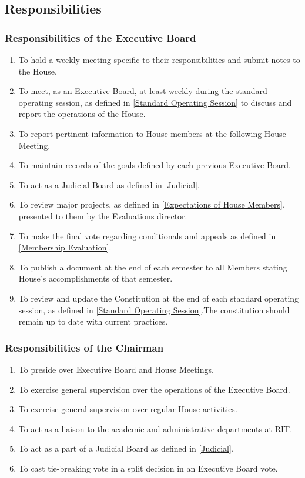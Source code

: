 \documentclass{article}
\newcommand{\asection}[1]{\subsection{#1} \label{#1}}
\newcommand{\asubsection}[1]{\subsubsection{#1} \label{#1}}
\begin{document}
\asection{Responsibilities}
\renewcommand{\theenumi}{\alph{enumi}} %
\asubsection{Responsibilities of the Executive Board}
\begin{enumerate}
	\item To hold a weekly meeting specific to their responsibilities and submit notes to the House.
	\item To meet, as an Executive Board, at least weekly during the standard operating session, as defined in \ref{Standard Operating Session} to discuss and report the operations of the House.
	\item To report pertinent information to House members at the following House Meeting.
	\item To maintain records of the goals defined by each previous Executive Board.
	\item To act as a Judicial Board as defined in \ref{Judicial}.
	\item To review major projects, as defined in \ref{Expectations of House Members},  presented to them by the Evaluations director.
	\item To make the final vote regarding conditionals and appeals as defined in \ref{Membership Evaluation}.
	\item To publish a document at the end of each semester to all Members stating House’s accomplishments of that semester.
	\item To review and update the Constitution at the end of each standard operating session, as defined in \ref{Standard Operating Session}.The constitution should remain up to date with current practices.
\end{enumerate}

\asubsection{Responsibilities of the Chairman}
\begin{enumerate}
	\item To preside over Executive Board and House Meetings.
	\item To exercise general supervision over the operations of the Executive Board.
	\item To exercise general supervision over regular House activities.
	\item To act as a liaison to the academic and administrative departments at RIT.
	\item To act as a part of a Judicial Board as defined in \ref{Judicial}.
	\item To cast tie-breaking vote in a split decision in an Executive Board vote.
\end{enumerate}
\end{document}

